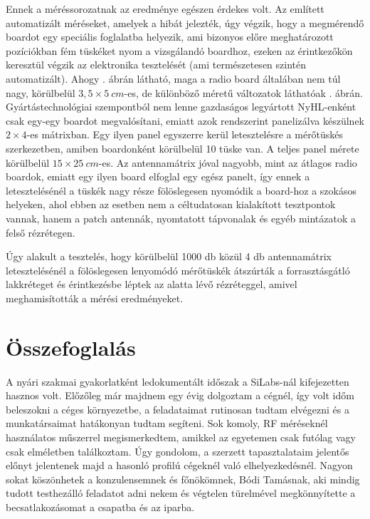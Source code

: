             Ennek a méréssorozatnak az eredménye egészen érdekes volt. Az említett automatizált méréseket, amelyek a hibát jelezték, úgy végzik, hogy a megmérendő boardot egy speciális foglalatba helyezik, ami bizonyos előre meghatározott pozíciókban fém tüskéket nyom a vizsgálandó boardhoz, ezeken az érintkezőkön keresztül végzik az elektronika tesztelését (ami természetesen szintén automatizált). Ahogy . ábrán látható, maga a radio board általában nem túl nagy, körülbelül $3,5 \times \SI{5}{cm}$-es, de különböző méretű változatok láthatóak . ábrán. Gyártástechnológiai szempontból nem lenne gazdaságos legyártott NyHL-enként csak egy-egy boardot megvalósítani, emiatt azok rendszerint panelizálva készülnek $2 \times 4$-es mátrixban. Egy ilyen panel egyszerre kerül letesztelésre a mérőtüskés szerkezetben, amiben boardonként körülbelül 10 tüske van. A teljes panel mérete körülbelül $15 \times \SI{25}{cm}$-es. Az antennamátrix jóval nagyobb, mint az átlagos radio boardok, emiatt egy ilyen board elfoglal egy egész panelt, így ennek a letesztelésénél a tüskék nagy része fölöslegesen nyomódik a board-hoz a szokásos helyeken, ahol ebben az esetben nem a céltudatosan kialakított tesztpontok vannak, hanem a patch antennák, nyomtatott tápvonalak és egyéb mintázatok a felső rézrétegen.
            \par
            Úgy alakult a tesztelés, hogy körülbelül 1000 db közül 4 db antennamátrix letesztelésénél a fölöslegesen lenyomódó mérőtüskék átszúrták a forrasztásgátló lakkréteget és érintkezésbe léptek az alatta lévő rézréteggel, amivel meghamisították a mérési eredményeket.
    \section{Összefoglalás}
        A nyári szakmai gyakorlatként ledokumentált időszak a SiLabs-nál kifejezetten hasznos volt. Előzőleg már majdnem egy évig dolgoztam a cégnél, így volt időm beleszokni a céges környezetbe, a feladataimat rutinosan tudtam elvégezni és a munkatársaimat hatákonyan tudtam segíteni. Sok komoly, RF méréseknél használatos műszerrel megismerkedtem, amikkel az egyetemen csak futólag vagy csak elméletben találkoztam. Úgy gondolom, a szerzett tapasztalataim jelentős előnyt jelentenek majd a hasonló profilú cégeknél való elhelyezkedésnél. Nagyon sokat köszönhetek a konzulensemnek és főnökömnek, Bódi Tamásnak, aki mindig tudott testhezálló feladatot adni nekem és végtelen türelmével megkönnyítette a becsatlakozásomat a csapatba és az iparba.



